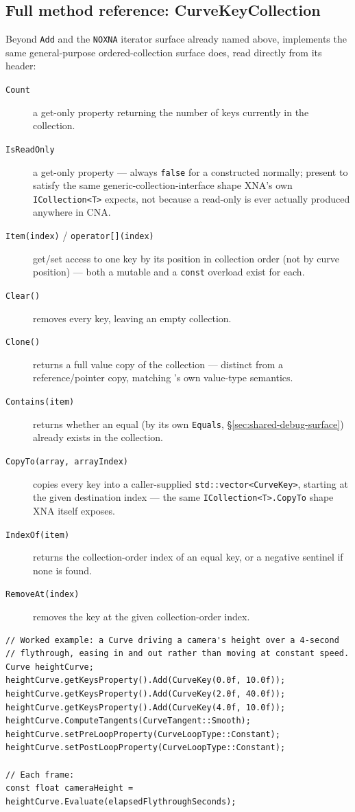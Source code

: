 \subsection{Full method reference: CurveKeyCollection}

Beyond \texttt{Add} and the \texttt{NOXNA} iterator surface already named above,
 implements the same general-purpose ordered-collection surface
 does, read directly from its header:

\begin{description}
\item[\texttt{Count}] a get-only property returning the number of keys currently in the
  collection.
\item[\texttt{IsReadOnly}] a get-only property --- always \texttt{false} for a
   constructed normally; present to satisfy the same
  generic-collection-interface shape XNA's own \texttt{ICollection<T>} expects, not because
  a read-only  is ever actually produced anywhere in CNA.
\item[\texttt{Item(index)} / \texttt{operator[](index)}] get/set access to one key by its
  position in collection order (not by curve position) --- both a mutable and a
  \texttt{const} overload exist for each.
\item[\texttt{Clear()}] removes every key, leaving an empty collection.
\item[\texttt{Clone()}] returns a full value copy of the collection --- distinct from a
  reference/pointer copy, matching 's own value-type semantics.
\item[\texttt{Contains(item)}] returns whether an equal  (by its own
  \texttt{Equals}, \S\ref{sec:shared-debug-surface}) already exists in the collection.
\item[\texttt{CopyTo(array, arrayIndex)}] copies every key into a caller-supplied
  \texttt{std::vector<CurveKey>}, starting at the given destination index --- the same
  \texttt{ICollection<T>.CopyTo} shape XNA itself exposes.
\item[\texttt{IndexOf(item)}] returns the collection-order index of an equal key, or a negative
  sentinel if none is found.
\item[\texttt{RemoveAt(index)}] removes the key at the given collection-order index.
\end{description}

\begin{lstlisting}
// Worked example: a Curve driving a camera's height over a 4-second
// flythrough, easing in and out rather than moving at constant speed.
Curve heightCurve;
heightCurve.getKeysProperty().Add(CurveKey(0.0f, 10.0f));
heightCurve.getKeysProperty().Add(CurveKey(2.0f, 40.0f));
heightCurve.getKeysProperty().Add(CurveKey(4.0f, 10.0f));
heightCurve.ComputeTangents(CurveTangent::Smooth);
heightCurve.setPreLoopProperty(CurveLoopType::Constant);
heightCurve.setPostLoopProperty(CurveLoopType::Constant);

// Each frame:
const float cameraHeight = heightCurve.Evaluate(elapsedFlythroughSeconds);
\end{lstlisting}

